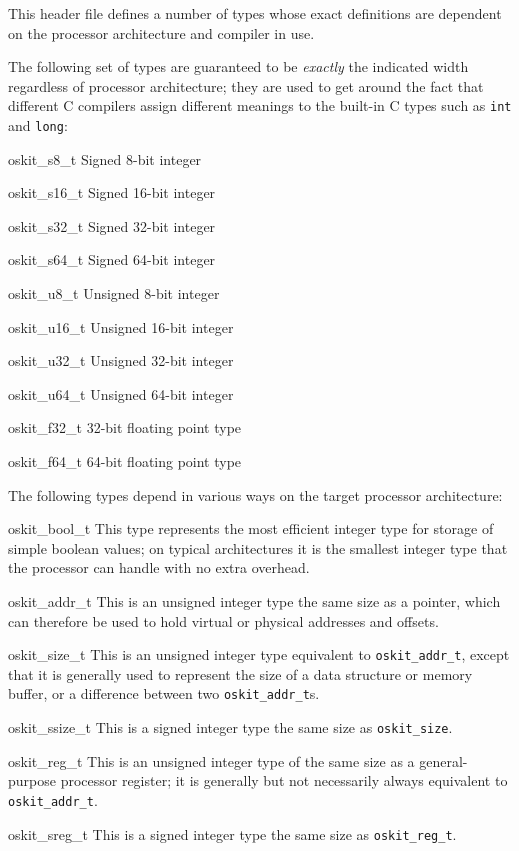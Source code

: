 \label{oskit-machine-types-h}
\begin{apisyn}
\end{apisyn}
\begin{apidesc}
	This header file defines a number of types
	whose exact definitions are dependent
	on the processor architecture and compiler in use.

	The following set of types
	are guaranteed to be \emph{exactly} the indicated width
	regardless of processor architecture;
	they are used to get around the fact that
	different C compilers assign different meanings
	to the built-in C types such as \texttt{int} and \texttt{long}:
	\begin{icsymlist}
	\item[oskit_s8_t]	Signed 8-bit integer
	\item[oskit_s16_t]	Signed 16-bit integer
	\item[oskit_s32_t]	Signed 32-bit integer
	\item[oskit_s64_t]	Signed 64-bit integer
	\item[oskit_u8_t]	Unsigned 8-bit integer
	\item[oskit_u16_t]	Unsigned 16-bit integer
	\item[oskit_u32_t]	Unsigned 32-bit integer
	\item[oskit_u64_t]	Unsigned 64-bit integer
	\item[oskit_f32_t]	32-bit floating point type
	\item[oskit_f64_t]	64-bit floating point type
	\end{icsymlist}

	The following types depend in various ways
	on the target processor architecture:
	\begin{icsymlist}
	\item[oskit_bool_t]
		This type represents the most efficient integer type
		for storage of simple boolean values;
		on typical architectures it is the smallest integer type
		that the processor can handle with no extra overhead.
	\item[oskit_addr_t]
		This is an unsigned integer type the same size as a pointer,
		which can therefore be used to hold
		virtual or physical addresses and offsets.
	\item[oskit_size_t]
		This is an unsigned integer type
		equivalent to \texttt{oskit_addr_t},
		except that it is generally used to represent
		the size of a data structure or memory buffer,
		or a difference between two \texttt{oskit_addr_t}s.
	\item[oskit_ssize_t]
		This is a signed integer type
		the same size as \texttt{oskit_size}.
	\item[oskit_reg_t]
		This is an unsigned integer type
		of the same size as a general-purpose processor register;
		it is generally but not necessarily always
		equivalent to \texttt{oskit_addr_t}.
	\item[oskit_sreg_t]
		This is a signed integer type
		the same size as \texttt{oskit_reg_t}.
	\end{icsymlist}
\end{apidesc}

